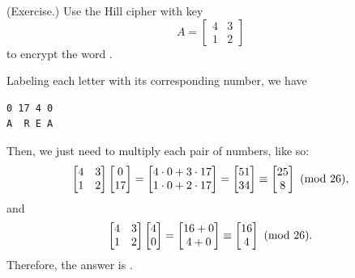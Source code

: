 \documentclass[letterpaper]{article}
\begin{document}
\begin{mdframed}
    (Exercise.) Use the Hill cipher with key \[A = \begin{bmatrix}
        4 & 3 \\ 1 & 2
    \end{bmatrix}\] to encrypt the word . 

    \begin{mdframed}
        Labeling each letter with its corresponding number, we have 
        \begin{mdframed}
            \begin{verbatim}
0 17 4 0
A  R E A\end{verbatim}
        \end{mdframed}
        Then, we just need to multiply each pair of numbers, like so: 
        \[\begin{bmatrix}
            4 & 3 \\ 1 & 2
        \end{bmatrix} \begin{bmatrix}
            0 \\ 17
        \end{bmatrix} = \begin{bmatrix}
            4 \cdot 0 + 3 \cdot 17 \\ 
            1 \cdot 0 + 2 \cdot 17
        \end{bmatrix} = \begin{bmatrix}
            51 \\ 
            34 
        \end{bmatrix} \equiv \begin{bmatrix}
            25 \\ 
            8
        \end{bmatrix} \ (\mathrm{mod}\ 26),\]
        and 
        \[\begin{bmatrix}
            4 & 3 \\ 1 & 2 
        \end{bmatrix} \begin{bmatrix}
            4 \\ 0
        \end{bmatrix} = \begin{bmatrix}
            16 + 0 \\ 
            4 + 0
        \end{bmatrix} \equiv \begin{bmatrix}
            16 \\ 4
        \end{bmatrix} \ (\mathrm{mod}\ 26).\] Therefore, the answer is .
    \end{mdframed}
\end{mdframed}
\end{document}
